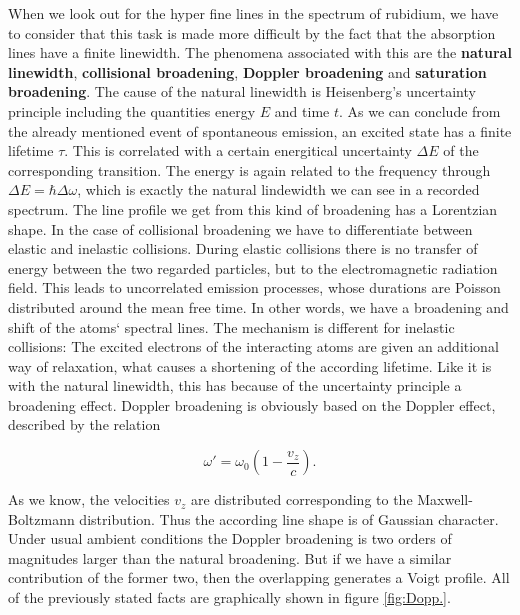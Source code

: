 When we look out for the hyper fine lines in the spectrum of rubidium, we have to consider that this task is made more difficult by the fact that the absorption lines have a finite linewidth. The phenomena associated with this are the \textbf{natural linewidth}, \textbf{collisional broadening}, \textbf{Doppler broadening} and \textbf{saturation broadening}. The cause of the natural linewidth is Heisenberg's uncertainty principle including the quantities energy $E$ and time $t$. As we can conclude from the already mentioned event of spontaneous emission, an excited state has a finite lifetime $\tau$. This is correlated with a certain energitical uncertainty $\Delta E$ of the corresponding transition. The energy is again related to the frequency through $\Delta E=\hbar \Delta \omega$, which is exactly the natural lindewidth we can see in a recorded spectrum. The line profile we get from this kind of broadening has a Lorentzian shape. In the case of collisional broadening we have to differentiate between elastic and inelastic collisions. During elastic collisions there is no transfer of energy between the two regarded particles, but to the electromagnetic radiation field. This leads to uncorrelated emission processes, whose durations are Poisson distributed around the mean free time. In other words, we have a broadening and shift of the atoms` spectral lines. The mechanism is different for inelastic collisions: The excited electrons of the interacting atoms are given an additional way of relaxation, what causes a shortening of the according lifetime. Like it is with the natural linewidth, this has because of the uncertainty principle a broadening effect. Doppler broadening is obviously based on the Doppler effect, described by the relation

\begin{equation}
\label{E:Dopp.}
\omega'=\omega_{0}\left(1-\frac{v_{z}}{c}\right).
\end{equation}

\noindent
As we know, the velocities $v_{z}$ are distributed corresponding to the Maxwell-Boltzmann distribution. Thus the according line shape is of Gaussian character. Under usual ambient conditions the Doppler broadening is two orders of magnitudes larger than the natural broadening. But if we have a similar contribution of the former two, then the overlapping generates a Voigt profile. All of the previously stated facts are graphically shown in figure \ref{fig:Dopp.}.

